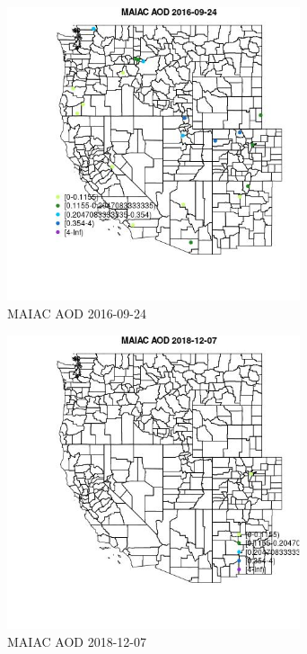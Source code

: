 \begin{figure} 
\centering  
\includegraphics[width=0.77\textwidth]{Code_Outputs/Report_ML_input_PM25_Step4_part_e_de_duplicated_aves_MapObsMAIAC_AOD2016-09-24.jpg} 
\caption{\label{fig:Report_ML_input_PM25_Step4_part_e_de_duplicated_avesMapObsMAIAC_AOD2016-09-24}MAIAC AOD 2016-09-24} 
\end{figure} 
 

\begin{figure} 
\centering  
\includegraphics[width=0.77\textwidth]{Code_Outputs/Report_ML_input_PM25_Step4_part_e_de_duplicated_aves_MapObsMAIAC_AOD2018-12-07.jpg} 
\caption{\label{fig:Report_ML_input_PM25_Step4_part_e_de_duplicated_avesMapObsMAIAC_AOD2018-12-07}MAIAC AOD 2018-12-07} 
\end{figure} 
 

